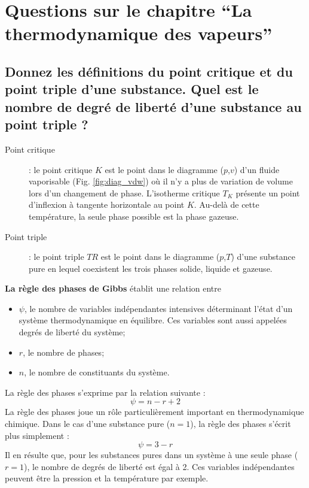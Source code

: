 \section{Questions sur le chapitre ``La thermodynamique des vapeurs''}
\subsection{Donnez les définitions du point critique et du point triple d'une substance. Quel est le nombre de degré de liberté d'une substance au point triple ?}
\begin{description}
\item[Point critique] : le point critique $K$ est le point dans le diagramme ($p$,$v$) d'un fluide vaporisable (Fig. \ref{fig:diag_vdw}) où il n'y a plus de variation de volume lors d'un changement de phase. L'isotherme critique $T_K$ présente un point d'inflexion à tangente horizontale au point $K$. Au-delà de cette température, la seule phase possible est la phase gazeuse.
\item[Point triple] : le point triple $TR$ est le point dans le diagramme ($p$,$T$) d'une substance pure en lequel coexistent les trois phases solide, liquide et gazeuse.
\end{description}
\textbf{La règle des phases de Gibbs} établit une relation entre 
\begin{itemize}
\item $\psi$, le nombre de variables indépendantes intensives déterminant l'état d'un système thermodynamique en équilibre. Ces variables sont aussi appelées degrés de liberté du système;
\item $r$, le nombre de phases;
\item $n$, le nombre de constituants du système.
\end{itemize}
La règle des phases s'exprime par la relation suivante :
\begin{equation} \psi = n - r + 2 \end{equation}
La règle des phases joue un rôle particulièrement important en thermodynamique chimique. Dans le cas d'une substance pure ($n=1$), la règle des phases s'écrit plus simplement :
\begin{equation} \psi = 3 - r \end{equation}
Il en résulte que, pour les substances pures dans un système à une seule phase ($r=1$), le nombre de degrés de liberté est égal à 2. Ces variables indépendantes peuvent être la pression et la température par exemple. 

